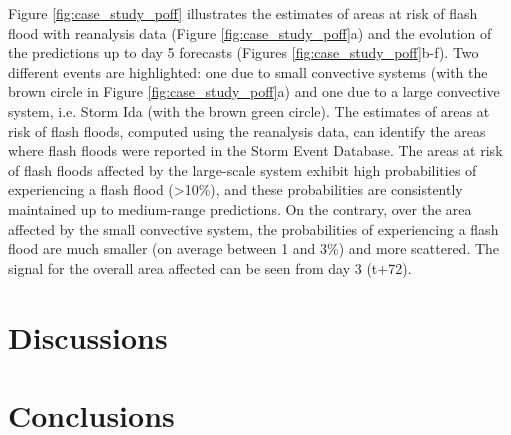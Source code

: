 Figure \ref{fig:case_study_poff} illustrates the estimates of areas at risk of flash flood with reanalysis data (Figure \ref{fig:case_study_poff}a) and the evolution of the predictions up to day 5 forecasts (Figures \ref{fig:case_study_poff}b-f). Two different events are highlighted: one due to small convective systems (with the brown circle in Figure \ref{fig:case_study_poff}a) and one due to a large convective system, i.e. Storm Ida (with the brown green circle). The estimates of areas at risk of flash floods, computed using the reanalysis data, can identify the areas where flash floods were reported in the Storm Event Database. The areas at risk of flash floods affected by the large-scale system exhibit high probabilities of experiencing a flash flood (>10\%), and these probabilities are consistently maintained up to medium-range predictions. On the contrary, over the area affected by the small convective system, the probabilities of experiencing a flash flood are much smaller (on average between 1 and 3\%) and more scattered. The signal for the overall area affected can be seen from day 3 (t+72).

\section{Discussions}
\label{data_driven_flash_floods_short_medium_range_discussions}


\section{Conclusions}
\label{data_driven_flash_floods_short_medium_range_conclusions}

